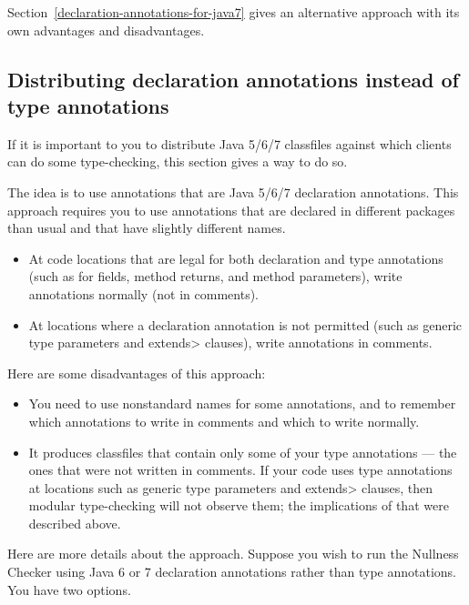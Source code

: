 Section~\ref{declaration-annotations-for-java7} gives an alternative
approach with its own advantages and disadvantages.


\subsection{Distributing declaration annotations instead of type annotations\label{declaration-annotations-for-java7}}

If it is important to you to distribute Java 5/6/7 classfiles against which
clients can do some type-checking, this section gives a way to do so.

The idea is to
use annotations that are Java 5/6/7 declaration annotations.
This approach requires you to use annotations that are declared in
different packages than usual and that have slightly different names.

\begin{itemize}
\item
At code locations that are legal for both declaration and type
annotations (such as for fields, method returns, and method parameters),
write annotations normally (not in comments).
\item
At locations where a declaration annotation is not permitted
(such as generic type parameters and \<extends> clauses), write
annotations in comments.
\end{itemize}

Here are some disadvantages of this approach:

\begin{itemize}
\item
  You need to use nonstandard names for
  some annotations, and to remember which annotations to write in comments
  and which to write normally.
\item
  It produces classfiles that contain only some of your type annotations
  --- the ones that were not written in comments.
  If your code uses type annotations at
  locations such as generic type parameters and \<extends> clauses, then
  modular type-checking will not observe them;
  the implications of that were described above.
\end{itemize}


Here are more details about the approach.
Suppose you wish to run the Nullness Checker using Java 6 or 7
declaration annotations rather than type annotations.  You have two options.

